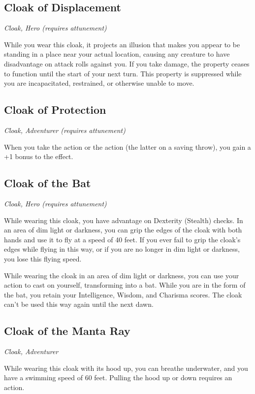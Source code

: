 \subsection{Cloak of Displacement}
\textit{Cloak, Hero (requires attunement)}

While you wear this cloak, it projects an illusion that makes you appear to be standing in a place near your actual location, causing any creature to have disadvantage on attack rolls against you. If you take damage, the property ceases to function until the start of your next turn. This property is suppressed while you are incapacitated, restrained, or otherwise unable to move.

\subsection{Cloak of Protection}
\textit{Cloak, Adventurer (requires attunement)}

When you take the  action or the  action (the latter on a saving throw), you gain a +1 bonus to the effect.

\subsection{Cloak of the Bat}
\textit{Cloak, Hero (requires attunement)}

While wearing this cloak, you have advantage on Dexterity (Stealth) checks. In an area of dim light or darkness, you can grip the edges of the cloak with both hands and use it to fly at a speed of 40 feet. If you ever fail to grip the cloak's edges while flying in this way, or if you are no longer in dim light or darkness, you lose this flying speed.

While wearing the cloak in an area of dim light or darkness, you can use your action to cast  on yourself, transforming into a bat. While you are in the form of the bat, you retain your Intelligence, Wisdom, and Charisma scores. The cloak can't be used this way again until the next dawn.

\subsection{Cloak of the Manta Ray}
\textit{Cloak, Adventurer}

While wearing this cloak with its hood up, you can breathe underwater, and you have a swimming speed of 60 feet. Pulling the hood up or down requires an action.

